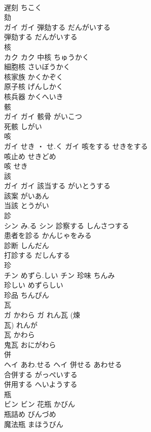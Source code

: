 \documentclass[8pt]{extreport}
\begin{document}
\begin{CJK}{UTF8}{min}
\\	遅刻	ちこく	
\\	劾	
\\	ガイ		ガイ	弾劾する	だんがいする	
\\	弾劾する	だんがいする	
\\	核	
\\	カク		カク	中核	ちゅうかく	
\\	細胞核	さいぼうかく	
\\	核家族	かくかぞく	
\\	原子核	げんしかく	
\\	核兵器	かくへいき	
\\	骸	
\\	ガイ		ガイ	骸骨	がいこつ	
\\	死骸	しがい	
\\	咳	
\\	ガイ	せき ・ せ.く	ガイ	咳をする	せきをする	
\\	咳止め	せきどめ	
\\	咳	せき	
\\	該	
\\	ガイ		ガイ	該当する	がいとうする	
\\	該案	がいあん	
\\	当該	とうがい	
\\	診	
\\	シン	み.る	シン	診察する	しんさつする	
\\	患者を診る	かんじゃをみる	
\\	診断	しんだん	
\\	打診する	だしんする	
\\	珍	
\\	チン	めずら.しい	チン	珍味	ちんみ	
\\	珍しい	めずらしい	
\\	珍品	ちんぴん	
\\	瓦	
\\	ガ	かわら	ガ	れん瓦 (煉
\\	瓦)	れんが	
\\	瓦	かわら	
\\	鬼瓦	おにがわら	
\\	併	
\\	ヘイ	あわ.せる	ヘイ	併せる	あわせる	
\\	合併する	がっぺいする	
\\	併用する	へいようする	
\\	瓶	
\\	ビン		ビン	花瓶	かびん	
\\	瓶詰め	びんづめ	
\\	魔法瓶	まほうびん	

\end{CJK}
\end{document}
